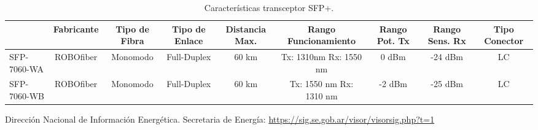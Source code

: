 \begin{table}[H]
  \tiny
  \centering
    \begin{tabular}{|l|c|c|c|c|c|c|c|c|}
    \hline
    \rowcolor[rgb]{ .773,  .851,  .945} \multicolumn{1}{|c|}{\textbf{Modelo}} & \textbf{Fabricante} & \textbf{Tipo de Fibra} & \textbf{Tipo de Enlace} & \textbf{Distancia Max.} & \textbf{Rango Funcionamiento} & \textbf{Rango Pot. Tx} & \textbf{Rango Sens. Rx} & \textbf{Tipo Conector} \bigstrut\\
    \hline
    \textcolor[rgb]{ .004,  .004,  .004}{SFP-7060-WA} & ROBOfiber & Monomodo & Full-Duplex & 60 km & Tx: 1310nm   Rx: 1550 nm & 0 dBm & -24 dBm & LC \bigstrut\\
    \hline
    \textcolor[rgb]{ .004,  .004,  .004}{SFP-7060-WB} & ROBOfiber & Monomodo & Full-Duplex & 60 km & Tx: 1550 nm  Rx: 1310 nm & -2 dBm & -25 dBm & LC \bigstrut\\
    \hline
    \end{tabular}%
    \caption{Características transceptor SFP+.}
  \label{tab:caracteristicas-SFP+}%
\end{table}%








\begin{thebibliography}{99}
Dirección Nacional de Información Energética. Secretaria de Energía: \url{https://sig.se.gob.ar/visor/visorsig.php?t=1}

\end{thebibliography}


\newpage